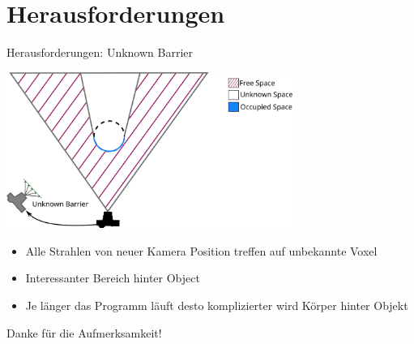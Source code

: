 \documentclass{beamer}
\begin{document}
\section{Herausforderungen}
\begin{frame}{Herausforderungen: Unknown Barrier}
	\begin{block}{}
		\begin{center}
			\includegraphics[width=0.7\textwidth]{Graphics/unknown_barrier_v2.png}
		\end{center}
		\begin{itemize}
			\item Alle Strahlen von neuer Kamera Position treffen auf unbekannte Voxel
			\item Interessanter Bereich hinter Object
			\item Je länger das Programm läuft desto komplizierter wird Körper hinter Objekt
		\end{itemize}
	\end{block}
\end{frame}

\begin{frame}{}
	\centering
	\Large{Danke für die Aufmerksamkeit!}
\end{frame}

\printbibliography
\end{document}
